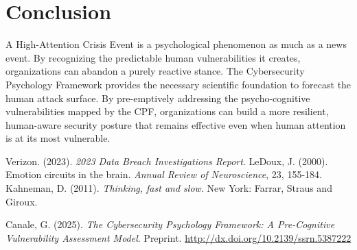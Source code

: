 \documentclass[11pt,a4paper]{article}
\begin{document}
\section{Conclusion}
A High-Attention Crisis Event is a psychological phenomenon as much as a news event. By recognizing the predictable human vulnerabilities it creates, organizations can abandon a purely reactive stance. The Cybersecurity Psychology Framework provides the necessary scientific foundation to forecast the human attack surface. By pre-emptively addressing the psycho-cognitive vulnerabilities mapped by the CPF, organizations can build a more resilient, human-aware security posture that remains effective even when human attention is at its most vulnerable.

\begin{thebibliography}{99}
 Verizon. (2023). \textit{2023 Data Breach Investigations Report}.
 LeDoux, J. (2000). Emotion circuits in the brain. \textit{Annual Review of Neuroscience}, 23, 155-184.
 Kahneman, D. (2011). \textit{Thinking, fast and slow}. New York: Farrar, Straus and Giroux.

 Canale, G. (2025). \textit{The Cybersecurity Psychology Framework: A Pre-Cognitive Vulnerability Assessment Model}. Preprint. \url{http://dx.doi.org/10.2139/ssrn.5387222} %

\end{thebibliography}
\end{document}
